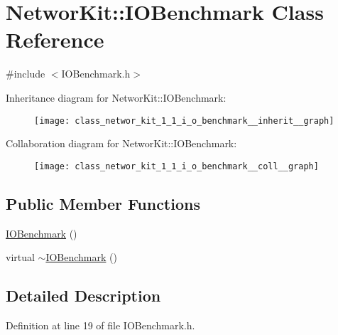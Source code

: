 \hypertarget{class_networ_kit_1_1_i_o_benchmark}{\section{Networ\-Kit\-:\-:I\-O\-Benchmark Class Reference}
\label{class_networ_kit_1_1_i_o_benchmark}
}


{\ttfamily \#include $<$I\-O\-Benchmark.\-h$>$}



Inheritance diagram for Networ\-Kit\-:\-:I\-O\-Benchmark\-:\nopagebreak
\begin{figure}[H]
\begin{center}
\leavevmode
\texttt{[image: class\_networ\_kit\_1\_1\_i\_o\_benchmark\_\_inherit\_\_graph]}
\end{center}
\end{figure}


Collaboration diagram for Networ\-Kit\-:\-:I\-O\-Benchmark\-:\nopagebreak
\begin{figure}[H]
\begin{center}
\leavevmode
\texttt{[image: class\_networ\_kit\_1\_1\_i\_o\_benchmark\_\_coll\_\_graph]}
\end{center}
\end{figure}
\subsection*{Public Member Functions}
\begin{DoxyCompactItemize}
\item 
\hyperlink{class_networ_kit_1_1_i_o_benchmark_a5c8ad846f3da3bea06de7a490de6efc3}{I\-O\-Benchmark} ()
\item 
virtual \hyperlink{class_networ_kit_1_1_i_o_benchmark_a846c75ef55c2ef9def07b0f918bf4571}{$\sim$\-I\-O\-Benchmark} ()
\end{DoxyCompactItemize}


\subsection{Detailed Description}


Definition at line 19 of file I\-O\-Benchmark.\-h.



